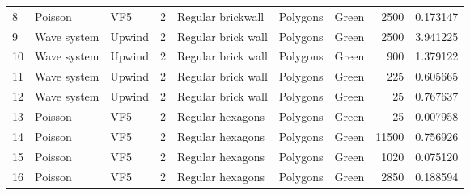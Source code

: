\begin{tabular}{lllrlllrr}
8   &           Poisson &                            VF5 &               2 &                         Regular brickwall &               Polygons  &                                Green &                     2500 &                         0.173147 \\
9   &       Wave system &                         Upwind &               2 &                        Regular brick wall &               Polygons  &                                Green &                     2500 &                         3.941225 \\
10  &       Wave system &                         Upwind &               2 &                        Regular brick wall &               Polygons  &                                Green &                      900 &                         1.379122 \\
11  &       Wave system &                         Upwind &               2 &                        Regular brick wall &               Polygons  &                                Green &                      225 &                         0.605665 \\
12  &       Wave system &                         Upwind &               2 &                        Regular brick wall &               Polygons  &                                Green &                       25 &                         0.767637 \\
13  &           Poisson &                            VF5 &               2 &                          Regular hexagons &               Polygons  &                                Green &                       25 &                         0.007958 \\
14  &           Poisson &                            VF5 &               2 &                          Regular hexagons &               Polygons  &                                Green &                    11500 &                         0.756926 \\
15  &           Poisson &                            VF5 &               2 &                          Regular hexagons &               Polygons  &                                Green &                     1020 &                         0.075120 \\
16  &           Poisson &                            VF5 &               2 &                          Regular hexagons &               Polygons  &                                Green &                     2850 &                         0.188594 \\

\end{tabular}
